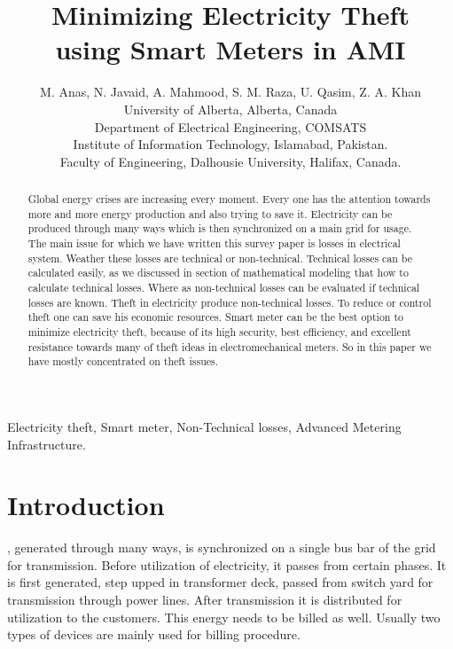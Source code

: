 \documentclass[10pt, conference, compsocconf]{IEEEtran}
\begin{document}
\title{Minimizing Electricity Theft\\ using Smart Meters in AMI}

\author{M. Anas, N. Javaid, A. Mahmood, S. M. Raza, U. Qasim, Z. A. Khan\\

        University of Alberta, Alberta, Canada\\
        Department of Electrical Engineering, COMSATS\\ Institute of
        Information Technology, Islamabad, Pakistan. \\
        Faculty of Engineering, Dalhousie University, Halifax, Canada.
        }

\maketitle


\begin{abstract}
Global energy crises are increasing every moment. Every one has the attention towards more and more energy production and also trying to save it. Electricity can be produced through many ways which is then synchronized on a main grid for usage. The main issue for which we have written this survey paper is losses in electrical system. Weather these losses are technical or non-technical. Technical losses can be calculated easily, as we discussed in section of mathematical modeling that how to calculate technical losses. Where as non-technical losses can be evaluated if technical losses are known. Theft in electricity produce non-technical losses. To reduce or control theft one can save his economic resources. Smart meter can be the best option to minimize electricity theft, because of its high security, best efficiency, and excellent resistance towards many of theft ideas in electromechanical meters. So in this paper we have mostly concentrated on theft issues.
\end{abstract}

\begin{IEEEkeywords}
Electricity theft, Smart meter, Non-Technical losses, Advanced Metering Infrastructure.
\end{IEEEkeywords}


\section{Introduction}
, generated through many ways, is synchronized on a single bus bar of the grid for transmission. Before utilization of electricity, it passes from certain phases. It is first generated, step upped in transformer deck, passed from switch yard for transmission through power lines. After transmission it is distributed for utilization to the customers. This energy needs to be billed as well. Usually two types of devices are mainly used for billing procedure.
\end{document}
